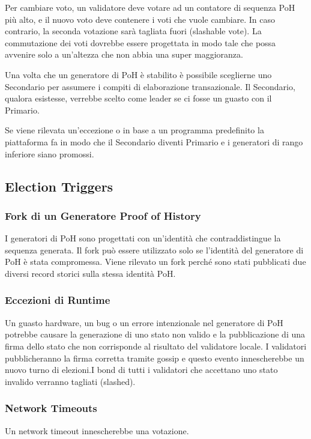 \documentclass[12pt]{article}
\begin{document}
Per cambiare voto, un validatore deve votare ad un contatore di sequenza PoH più alto, e il nuovo voto deve contenere i voti che vuole cambiare. In caso contrario, la seconda votazione sarà tagliata fuori (slashable vote). La commutazione dei voti dovrebbe essere progettata in modo tale che possa avvenire solo a un'altezza che non abbia una super maggioranza.

Una volta che un generatore di PoH è stabilito è possibile sceglierne uno Secondario per assumere i compiti di elaborazione transazionale. Il Secondario, qualora esistesse, verrebbe scelto come leader se ci fosse un guasto con il Primario.

Se viene rilevata un'eccezione o in base a un programma predefinito la piattaforma fa in modo che il Secondario diventi Primario e i generatori di rango inferiore siano promossi.
\subsection{Election Triggers}
\subsubsection{Fork di un Generatore Proof of History}

I generatori di PoH sono progettati con un'identità che contraddistingue la sequenza generata. Il fork può essere utilizzato solo se l'identità del generatore di PoH è stata compromessa. Viene rilevato un fork perché sono stati pubblicati due diversi record storici sulla stessa identità PoH.

\subsubsection{Eccezioni di Runtime}
Un guasto hardware, un bug o un errore intenzionale nel generatore di PoH potrebbe causare la generazione di uno stato non valido e la pubblicazione di una firma dello stato che non corrisponde al risultato del validatore locale. I validatori pubblicheranno la firma corretta tramite gossip e questo evento innescherebbe un nuovo turno di elezioni.I bond di tutti i validatori che accettano uno stato invalido verranno tagliati (slashed).

\subsubsection{Network Timeouts}

Un network timeout innescherebbe una votazione.
\end{document}
